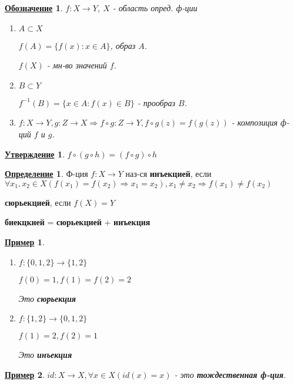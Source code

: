 \documentclass[12pt]{article}
\newtheorem{statement}{\underline{Утверждение}}[section]
\newtheorem*{symb}{\underline{Обозначение}}
\newtheorem*{example}{\underline{Пример}}
\theoremstyle{definition}
\newtheorem{definition}{\underline{Определение}}[section]
\theoremstyle{definition}
\begin{document}
\begin{symb}
$f: X \rightarrow Y$, $X$ - область опред. ф-ции

\begin{enumerate}
    \item $A \subset X$ 

    $f(A) = \{f(x) \colon x \in A\}$, образ $A$.

    $f(X)$ - мн-во значений $f$.

    \item $B \subset Y$

    $f^{-1}(B) = \{x \in A \colon f(x) \in B\}$ - прообраз $B$.

    \item $f: X \rightarrow Y, g: Z \rightarrow X \Rightarrow f \circ g: Z \rightarrow Y, f \circ g(z) = f(g(z))$ - композиция ф-ций $f$ и $g$.
\end{enumerate}
\end{symb}

\begin{statement}
$f \circ (g \circ h) = (f \circ g) \circ h$
\end{statement}

\begin{definition}
Ф-ция $f: X \rightarrow Y$ наз-ся  \textbf{инъекцией}, если $\forall x_1, x_2 \in X (f(x_1) = f(x_2) \Rightarrow x_1 = x_2), x_1 \neq x_2 \Rightarrow f(x_1) \neq f(x_2)$ 

\textbf{сюрьекцией}, если $f(X) = Y$

\textbf{биекцкией} = \textbf{сюрьекцией} + \textbf{инъекция}
\end{definition}
\begin{example}
\begin{enumerate}
    \item 
        
$f: \{0, 1, 2\} \rightarrow \{1, 2\}$ 

$f(0) = 1, f(1) = f(2) = 2$

Это \textbf{сюрьекция}
    \item
$f: \{1, 2\} \rightarrow \{0, 1, 2\}$ 

$f(1) = 2, f(2) = 1$ 

Это \textbf{инъекция}
\end{enumerate}

\end{example}

\begin{example}
$id: X \rightarrow X, \forall x \in X (id(x) = x)$ - это \textbf{тождественная ф-ция}.
\end{example}
\end{document}
